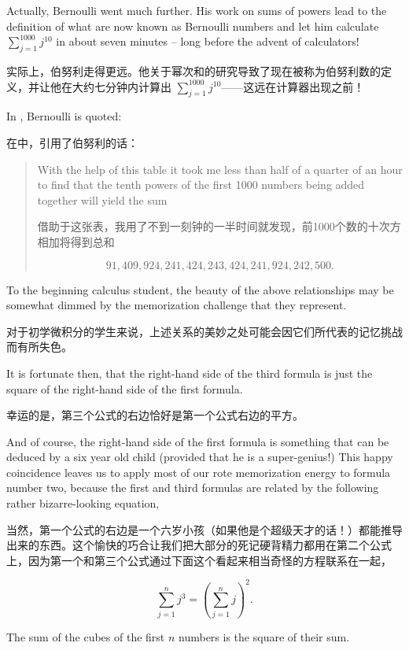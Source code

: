 Actually, Bernoulli went much further.  His work
on sums of powers lead to the definition of what are now known as Bernoulli
numbers and let him calculate $\sum_{j=1}^{1000}j^{10}$ in 
about seven minutes --
long before the advent of calculators!

实际上，伯努利走得更远。他关于幂次和的研究导致了现在被称为伯努利数的定义，并让他在大约七分钟内计算出 $\sum_{j=1}^{1000}j^{10}$——这远在计算器出现之前！

In \cite[p. 320]{struik}, Bernoulli is 
quoted:

在\cite[p. 320]{struik}中，引用了伯努利的话：

\begin{quote}
With the help of this table it took me less than half of a quarter of an hour
to find that the tenth powers of the first 1000 numbers being added together 
will yield the sum 

借助于这张表，我用了不到一刻钟的一半时间就发现，前1000个数的十次方相加将得到总和

\[ 91,409,924,241,424,243,424,241,924,242,500.
\]

\end{quote}

To the beginning calculus student, the beauty of the above relationships may
be somewhat dimmed by the memorization challenge that they represent.

对于初学微积分的学生来说，上述关系的美妙之处可能会因它们所代表的记忆挑战而有所失色。

It
is fortunate then, that the right-hand side of the third formula is just 
the square of the right-hand side of the first formula.

幸运的是，第三个公式的右边恰好是第一个公式右边的平方。

And of course,
the right-hand side of the first formula is something that can be deduced 
by a six year old child (provided that he is a super-genius!)  This happy
coincidence leaves us to apply most of our rote memorization energy to
formula number two, because the first and third formulas are related by
the following rather bizarre-looking equation,

当然，第一个公式的右边是一个六岁小孩（如果他是个超级天才的话！）都能推导出来的东西。这个愉快的巧合让我们把大部分的死记硬背精力都用在第二个公式上，因为第一个和第三个公式通过下面这个看起来相当奇怪的方程联系在一起，

\[
\sum_{j=1}^n j^3 = \left( \sum_{j=1}^n j \right)^2.
\]       

\noindent The sum of the cubes of the first $n$ numbers is the square of their sum.

